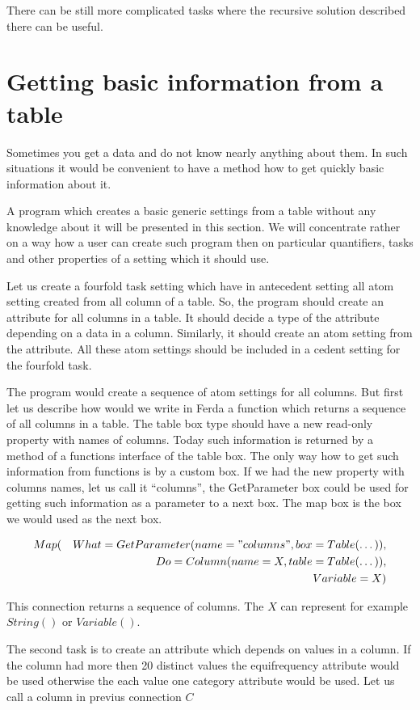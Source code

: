 \documentclass[a4paper,12pt]{book}
\begin{document}
There can be still more complicated tasks where the recursive solution described there can be useful.

\section{Getting basic information from a table}
Sometimes you get a data and do not know nearly anything about them. In such situations it would be convenient to have a method how to get quickly basic information about it.

A program which creates a basic generic settings from a table without any knowledge about it will be presented in this section. We will concentrate rather on a way how a user can create such program then on particular quantifiers, tasks and other properties of a setting which it should use.

Let us create a fourfold task setting which have in antecedent setting all atom setting created from all column of a table. So, the program should create an attribute for all columns in a table. It should decide a type of the attribute depending on a data in a column. Similarly, it should create an atom setting from the attribute. All these atom settings should be included in a cedent setting for the fourfold task.

The program would create a sequence of atom settings for all columns. But first let us describe how would we write in Ferda a function which returns a sequence of all columns in a table. The table box type should have a new read-only property with names of columns. Today such information is returned by a method of a functions interface of the table box. The only way how to get such information from functions is by a custom box. If we had the new property with columns names, let us call it ``columns'', the GetParameter box could be used for getting such information as a parameter to a next box. The map box is the box we would used as the next box.

\begin{eqnarray*}
Map(&&What=GetParameter(name="columns", box=Table(\dots)), \\&& Do=Column(name=X, table=Table(\dots)), \\&& Variable=X)
\end{eqnarray*}

This connection returns a sequence of columns. The $X$ can represent for example $String()$ or $Variable()$.

The second task is to create an attribute which depends on values in a column. If the column had more then 20 distinct values the equifrequency attribute would be used otherwise the each value one category attribute would be used. Let us call a column in previus connection $C$
\end{document}
